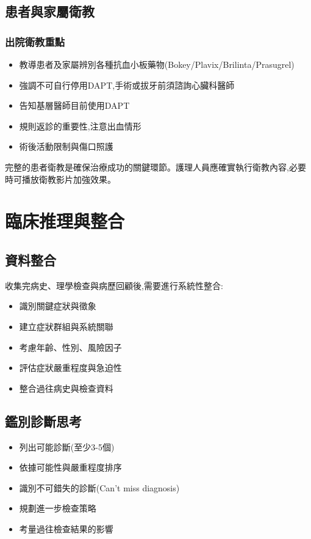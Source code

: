 \documentclass[12pt,a4paper]{article}
\newcommand{\note}[1]{
    \par
    \noindent
    \begin{tcolorbox}[
        colback=emergency_blue!5!white,
        colframe=emergency_blue,
        title=\textbf{重點提醒},
        fonttitle=\bfseries,
        boxrule=0.5pt,
        arc=3pt,
        left=6pt,
        right=6pt,
        top=6pt,
        bottom=6pt
    ]
    #1
    \end{tcolorbox}
}
\begin{document}
\subsection{患者與家屬衛教}
\subsubsection{出院衛教重點}
\begin{itemize}[nosep]
    \item 教導患者及家屬辨別各種抗血小板藥物(Bokey/Plavix/Brilinta/Prasugrel)
    \item 強調不可自行停用DAPT,手術或拔牙前須諮詢心臟科醫師
    \item 告知基層醫師目前使用DAPT
    \item 規則返診的重要性,注意出血情形
    \item 術後活動限制與傷口照護
\end{itemize}

\note{
完整的患者衛教是確保治療成功的關鍵環節。護理人員應確實執行衛教內容,必要時可播放衛教影片加強效果。
}

\section{臨床推理與整合}

\subsection{資料整合}
收集完病史、理學檢查與病歷回顧後,需要進行系統性整合:
\begin{itemize}[nosep]
    \item 識別關鍵症狀與徵象
    \item 建立症狀群組與系統關聯
    \item 考慮年齡、性別、風險因子
    \item 評估症狀嚴重程度與急迫性
    \item 整合過往病史與檢查資料
\end{itemize}

\subsection{鑑別診斷思考}
\begin{itemize}[nosep]
    \item 列出可能診斷(至少3-5個)
    \item 依據可能性與嚴重程度排序
    \item 識別不可錯失的診斷(Can't miss diagnosis)
    \item 規劃進一步檢查策略
    \item 考量過往檢查結果的影響
\end{itemize}
\end{document}
